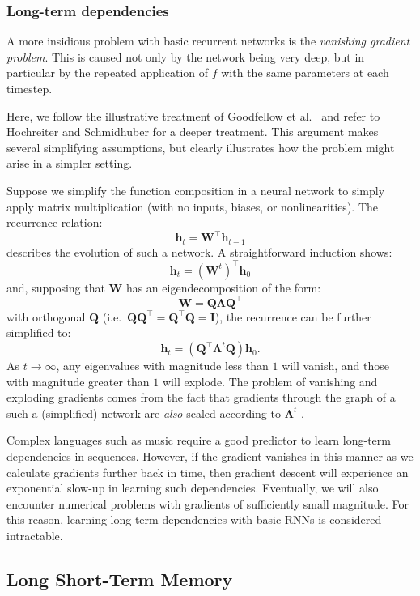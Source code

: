 \documentclass[12pt,a4paper,twoside,openright]{report}
\newcommand{\vect}[1]{\boldsymbol{\mathbf{#1}}}
\begin{document}
\subsubsection{Long-term dependencies}

A more insidious problem with basic recurrent networks is the \emph{vanishing
gradient problem}. This is caused not only by the network being very deep, but
in particular by the repeated application of $f$ with the same parameters at
each timestep.

Here, we follow the illustrative treatment of Goodfellow et al.\
\cite{Goodfellow-et-al-2016} and refer to Hochreiter and Schmidhuber
\cite{hochreiter1997long} for a deeper treatment. This argument makes several
simplifying assumptions, but clearly illustrates how the problem might arise in
a simpler setting.

Suppose we simplify the function composition in a neural network to simply apply
matrix multiplication (with no inputs, biases, or nonlinearities). The
recurrence relation: 
$$ \vect{h}_t = \vect{W}^\top \vect{h}_{t-1} $$ 
describes the evolution of such a network. A straightforward induction shows:
$$ \vect{h}_t = (\vect{W}^t)^\top\vect{h}_0 $$
and, supposing that $\vect{W}$ has an eigendecomposition of the form:
$$ \vect{W} = \vect{Q}\vect{\Lambda}\vect{Q}^\top $$
with orthogonal $\vect{Q}$ (i.e.\ $\vect{Q}\vect{Q}^\top = \vect{Q}^\top\vect{Q}
= \vect{I}$), the recurrence can be further simplified to:
$$ \vect{h}_t = (\vect{Q}^\top \vect{\Lambda}^t \vect{Q}) \vect{h}_0. $$
As $t \rightarrow \infty$, any eigenvalues with magnitude less than $1$ will
vanish, and those with magnitude greater than $1$ will explode. The problem of
vanishing and exploding gradients comes from the fact that gradients through the
graph of a such a (simplified) network are \emph{also} scaled according to
$\vect{\Lambda}^t$ \cite{Goodfellow-et-al-2016}.

Complex languages such as music require a good predictor to learn long-term
dependencies in sequences. However, if the gradient vanishes in this manner as
we calculate gradients further back in time, then gradient descent will
experience an exponential slow-up in learning such dependencies. Eventually,
we will also encounter numerical problems with gradients of sufficiently small
magnitude. For this reason, learning long-term dependencies with basic RNNs is
considered intractable.

\subsection{Long Short-Term Memory}\label{sec:lstm-prep}
\end{document}
